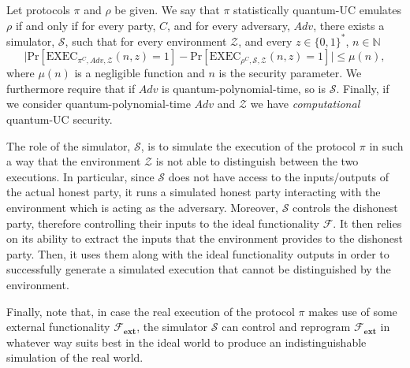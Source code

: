 \begin{definition}

Let protocols $\pi$ and $\rho$ be given. We say that $\pi$ statistically quantum-UC emulates $\rho$ if and only if for every party, $C$, and for every adversary, $Adv$, there exists a simulator, $\mathcal{S}$, such that for every environment $\mathcal{Z}$, and every $z\in\{0,1\}^*$, $n\in\mathbb{N}$
\begin{equation*}
    \big|\text{Pr}[\text{EXEC}_{\mathcal{\pi}^C, Adv, \mathcal{Z}} (n, z) = 1] - \text{Pr}[\text{EXEC}_{\rho^C, \mathcal{S}, \mathcal{Z}}(n, z) = 1]\big| \leq \mu(n),
\end{equation*}
 where $\mu(n)$ is a negligible function and $n$ is the security parameter. We furthermore require that if $Adv$ is quantum-polynomial-time, so is $\mathcal{S}$. Finally, if we consider quantum-polynomial-time $Adv$ and $\mathcal{Z}$ we have \textit{computational} quantum-UC security.
\label{def:statisticalquc}
\end{definition}



 The role of the simulator, $\mathcal{S}$, is to  simulate the execution of the protocol $\mathcal{\pi}$ in such a way that the environment $\mathcal{Z}$ is not able to distinguish between the two executions. 
In particular, since $\mathcal{S}$ does not have access to the inputs/outputs of the actual honest party, it runs a simulated honest party interacting with the environment which is acting as the adversary. Moreover, $\mathcal{S}$ controls the  dishonest party, therefore controlling their inputs to the ideal functionality $\mathcal{F}$. 
It then relies on its ability to extract the inputs  that the environment provides to the dishonest party. Then, it uses them along with the ideal functionality outputs in order to successfully generate a simulated execution that cannot be distinguished by the environment.

Finally, note that, in case the real execution of the protocol $\mathcal{\pi}$ makes use of some external functionality $\mathcal{F}_{\textbf{ext}}$, the simulator $\mathcal{S}$ can control and reprogram $\mathcal{F}_{\textbf{ext}}$ in whatever way suits best in the ideal world to produce an indistinguishable simulation of the real world.




